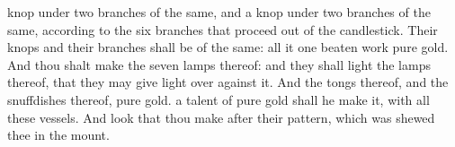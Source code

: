 {knop under
two
branches of the same, and a
knop under
two
branches of the same, according to the
six
branches that
proceed out of the
candlestick.
Their
knops and their
branches shall be of the same: all it
{}
one beaten
work
{}
pure
gold.
And thou shalt
make the
seven
lamps thereof: and they shall
light the
lamps thereof, that they may give
light over
against
it.
And the
tongs thereof, and the
snuffdishes thereof,
{}
pure
gold.
 a
talent of
pure
gold shall he
make it, with all these
vessels.
And
look that thou
make
{} after their
pattern, which was
shewed thee in the
mount.

}
